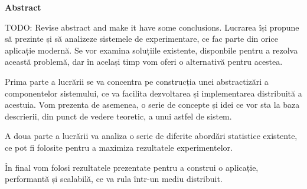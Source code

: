 \thispagestyle{plain}

\vspace*{\fill}

\begin{center}
	\Large \textbf{Abstract}	
\end{center}

TODO: Revise abstract and make it have some conclusions.
Lucrarea își propune să prezinte și să analizeze sistemele de experimentare, ce fac parte din orice aplicație modernă. Se vor examina soluțiile existente, disponbile pentru a rezolva această problemă, dar în același timp vom oferi o alternativă pentru acestea.

Prima parte a lucrării se va concentra pe construcția unei abstractizări a componentelor sistemului, ce va facilita dezvoltarea și implementarea distribuită a acestuia. Vom prezenta  de asemenea, o serie de concepte și idei ce vor sta la baza descrierii, din punct de vedere teoretic, a unui astfel de sistem.

A doua parte a lucrării va analiza o serie de diferite abordări statistice existente, ce pot fi folosite pentru a maximiza rezultatele experimentelor. 

În final vom folosi rezultatele prezentate pentru a construi o aplicație, performantă și scalabilă, ce va rula într-un mediu distribuit.

\vspace*{\fill}
